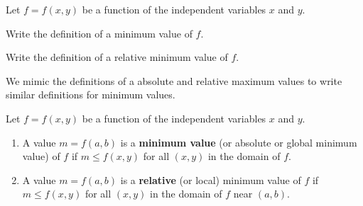 \begin{activity} \label{A:10.7.1} Let $f = f(x,y)$ be a function of the independent variables $x$ and $y$.
	\ba
	\item Write the definition of a minimum value of $f$.
	
	
	\item Write the definition of a relative minimum value of $f$.
	
	\ea

\end{activity}
\begin{smallhint}

\end{smallhint}
\begin{bighint}

\end{bighint}
\begin{activitySolution}
We mimic the definitions of a absolute and relative maximum values to write similar definitions for minimum values.

Let $f = f(x,y)$ be a function of the independent variables $x$ and $y$.
\begin{enumerate}
\item A value $m = f(a,b)$ is a \textbf{minimum value} (or absolute or global minimum value) of $f$ if $m \leq f(x,y)$ for all $(x,y)$ in the domain of $f$.
\item A value $m = f(a,b)$ is a \textbf{relative} (or local) minimum value of $f$ if $m \leq f(x,y)$ for all $(x,y)$ in the domain of $f$ near $(a,b)$.
\end{enumerate}
\end{activitySolution}
\aftera
